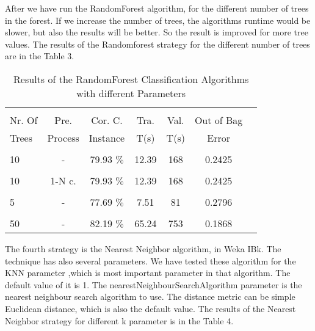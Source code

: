 \documentclass[a4paper]{article}
\begin{document}
After we have run the RandomForest algorithm, for the different number of trees in the forest. If we increase the number of trees, the algorithms runtime would be slower, but also the results will be better. So the result is improved for more tree values. The results of the  Randomforest  strategy for the different number of trees are in the Table 3.


\begin{table}
\begin{tabular}{|l| c | c | c | c |c |c |}

\hline & & & & & \\
Nr. Of & Pre. & Cor. C.& Tra. & Val. & Out of Bag  \\
Trees & Process & Instance & T(s) &  T(s) & Error  \\
\hline & & & & & \\
10	 & - &			79.93  $\%$ & 12.39 & 168 & 0.2425  \\ 
\hline & & & & & \\
10 	 & 1-N c. &	79.93  $\%$ & 12.39 & 168 & 0.2425  \\ 
\hline & & & & & \\
5 	& - &			77.69 $\%$ & 7.51 & 81 & 0.2796   \\ 
\hline & & & & &  \\
50 	 & - &			82.19  $\%$ & 65.24 & 753 &  0.1868 \\ 
\hline
\end{tabular}
\caption{Results of the RandomForest Classification Algorithms with different Parameters}
\end{table}

The fourth strategy is the  Nearest Neighbor algorithm, in Weka IBk. The technique has also several parameters. We have tested these algorithm for the KNN parameter ,which is most important parameter in that algorithm. The default value of it is 1. The nearestNeighbourSearchAlgorithm parameter is the nearest neighbour search algorithm to use. The distance metric can be simple Euclidean distance, which is also the default value. The results of the  Nearest Neighbor  strategy for different k parameter is in the Table 4.
\end{document}
